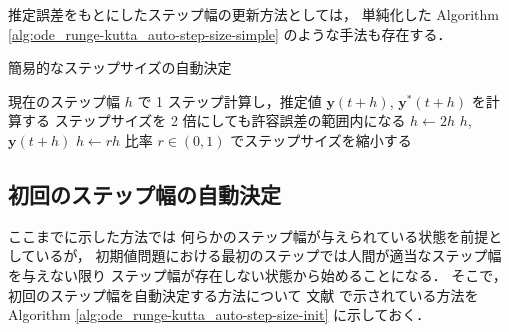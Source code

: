 推定誤差をもとにしたステップ幅の更新方法としては，
単純化した
Algorithm \ref{alg:ode_runge-kutta_auto-step-size-simple}
のような手法も存在する．

\begin{algorithm}[tbp]
    \caption{簡易的なステップサイズの自動決定 \cite[4.1 節 (a)]{Mitsui1993}}
    \label{alg:ode_runge-kutta_auto-step-size-simple}
    \begin{algorithmic}
        \Loop
        \State 現在のステップ幅 $h$ で 1 ステップ計算し，推定値 $\bm{y}(t + h)$, $\bm{y}^*(t+h)$ を計算する
        \Comment ステップサイズを 2 倍にしても許容誤差の範囲内になる
        \State $h \gets 2 h$
        \EndIf
        \State \Return $h$, $\bm{y}(t + h)$
        \EndIf
        \State $h \gets r h$ \Comment 比率 $r \in (0, 1)$ でステップサイズを縮小する
        \EndLoop
        \EndProcedure
    \end{algorithmic}
\end{algorithm}

\subsection{初回のステップ幅の自動決定}

ここまでに示した方法では
何らかのステップ幅が与えられている状態を前提としているが，
初期値問題における最初のステップでは人間が適当なステップ幅を与えない限り
ステップ幅が存在しない状態から始めることになる．
そこで，初回のステップ幅を自動決定する方法について
文献 \cite[Section II.4]{Hairer1993} で示されている方法を
Algorithm \ref{alg:ode_runge-kutta_auto-step-size-init}
に示しておく．

